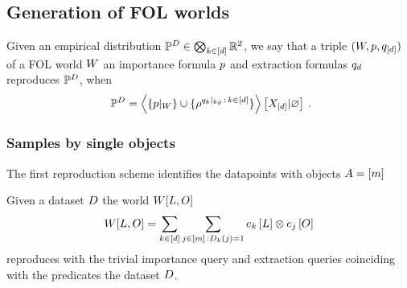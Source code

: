 


\subsection{Generation of FOL worlds}


\begin{definition}
	Given an empirical distribution $\mathbb{P}^{D}\in\bigotimes_{k\in[d]}\mathbb{R}^2$, we say that a triple $(W,p,q_{[d]})$ of a FOL world $W$ an importance formula $p$ and extraction formulas $q_{d}$ reproduces $\mathbb{P}^{D}$, when 
		\[ \empdistribution = \normationof{\{\groundingof{\impformula}\}\cup\{\rencodingof{\kggroundingof{\extformulaof{\atomenumerator}}\, : \, \atomenumeratorin}\}}{\shortcatvariables} \, .  \]
\end{definition}


\subsubsection{Samples by single objects}

The first reproduction scheme identifies the datapoints with objects $A=[m]$

\begin{theorem}
	Given a dataset $D$ the world $W[L,O]$ 
	\begin{align*}
		W[L,O] = \sum_{k\in[d]} \sum_{j\in[m] \, : D_{k}(j)=1} e_{k}\left[L\right] \otimes e_{j}\left[O\right]
	\end{align*}
	reproduces with the trivial importance query and extraction queries coinciding with the predicates the dataset $D$.
\end{theorem}



